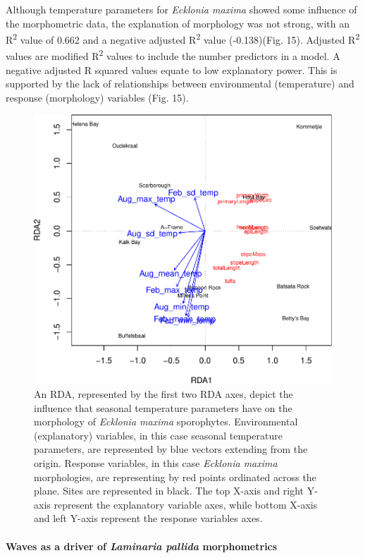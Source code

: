 \documentclass[10pt,a4,]{article}
\makeatletter
\def\maxwidth{\ifdim\Gin@nat@width>\linewidth\linewidth
\else\Gin@nat@width\fi}
\let\Oldincludegraphics\includegraphics
\renewcommand{\includegraphics}[1]{\Oldincludegraphics[width=\maxwidth]{#1}}
\makeatother
\begin{document}
Although temperature parameters for \emph{Ecklonia maxima} showed some
influence of the morphometric data, the explanation of morphology was
not strong, with an R\textsuperscript{2} value of 0.662 and a negative
adjusted R\textsuperscript{2} value (-0.138)(Fig. 15). Adjusted
R\textsuperscript{2} values are modified R\textsuperscript{2} values to
include the number predictors in a model. A negative adjusted R squared
values equate to low explanatory power. This is supported by the lack of
relationships between environmental (temperature) and response
(morphology) variables (Fig. 15).

\begin{figure}
\centering
\includegraphics{chapter_2_files/figure-latex/unnamed-chunk-27-1.pdf}
\caption{An RDA, represented by the first two RDA axes, depict the
influence that seasonal temperature parameters have on the morphology of
\emph{Ecklonia maxima} sporophytes. Environmental (explanatory)
variables, in this case seasonal temperature parameters, are represented
by blue vectors extending from the origin. Response variables, in this
case \emph{Ecklonia maxima} morphologies, are representing by red points
ordinated across the plane. Sites are represented in black. The top
X-axis and right Y-axis represent the explanatory variable axes, while
bottom X-axis and left Y-axis represent the response variables axes.}
\end{figure}

\hypertarget{waves-as-a-driver-of-laminaria-pallida-morphometrics}{%
\paragraph{\texorpdfstring{Waves as a driver of \emph{Laminaria pallida}
morphometrics}{Waves as a driver of Laminaria pallida morphometrics}}\label{waves-as-a-driver-of-laminaria-pallida-morphometrics}}
\end{document}
